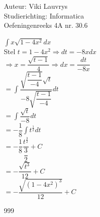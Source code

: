 \documentclass[a4paper]{article}
\begin{document}
  
\noindent \large Auteur: Viki	Lauvrys \\
\noindent \large Studierichting: Informatica\\
\noindent \large Oefeningenreeks 4A nr. 30.6\\

\medskip

\normalsize

$ \displaystyle\int x \sqrt{1 - 4x^2} dx $ \\

Stel $ t = 1 -4x^2 \Rightarrow dt = -8x dx $ \\

$ \Rightarrow x = \dfrac{\sqrt{t-1}}{4} \Rightarrow dx = \dfrac{dt}{-8x} $ \\

$ = \displaystyle\int \dfrac{\sqrt{\dfrac{t-1}{-4}} \sqrt{t}}{-8 \sqrt{\dfrac{t-1}{-4}}} dt $ \\

$ = \displaystyle\int \dfrac{\sqrt{t}}{-8} dt $ \\

$ = - \dfrac{1}{8} \displaystyle\int t^{\tfrac{1}{2}} dt $ \\

$ = - \dfrac{1}{8} \dfrac{t^{\tfrac{3}{2}}}{\dfrac{3}{2}} + C $ \\

$ = - \dfrac{\sqrt{t^3}}{12} + C $ \\

$ = - \dfrac{\sqrt{(1 -4x^2)^3}}{12} + C $ \\

\begin{thebibliography}{999}
\end{thebibliography}
\end{document}
